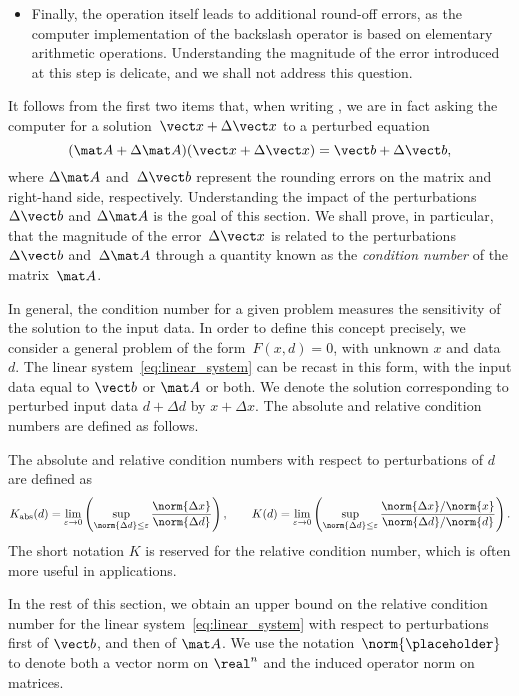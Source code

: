 \begin{example}
\begin{itemize}
    \item
        Finally, the operation  itself leads to additional round-off errors,
        as the computer implementation of the backslash operator is based on elementary arithmetic operations.
        Understanding the magnitude of the error introduced at this step is delicate,
        and we shall not address this question.
\end{itemize}
It follows from the first two items that, when writing ,
we are in fact asking the computer for a solution~$\vect x + \Delta \vect x$ to a perturbed equation
\[
    (\mat A + \Delta \mat A) (\vect x + \Delta \vect x) = \vect b + \Delta \vect b,
\]
where $\Delta \mat A$ and~$\Delta \vect b$ represent the rounding errors on the matrix and right-hand side, respectively.
Understanding the impact of the perturbations~$\Delta \vect b$ and $\Delta \mat A$ is the goal of this section.
We shall prove,
in particular,
that the magnitude of the error~$\Delta \vect x$ is related to the perturbations~$\Delta \vect b$ and~$\Delta \mat A$ through a quantity known as the \emph{condition number} of the matrix~$\mat A$.
\end{example}

In general, the condition number for a given problem measures the sensitivity of the solution to the input data.
In order to define this concept precisely,
we consider a general problem of the form~$F(x, d) = 0$,
with unknown $x$ and data $d$.
The linear system~\eqref{eq:linear_system} can be recast in this form,
with the input data equal to $\vect b$ or $\mat A$ or both.
We denote the solution corresponding to perturbed input data $d + \Delta d$ by $x + \Delta x$.
The absolute and relative condition numbers are defined as follows.

\begin{definition}
    [Condition number for the problem $F(x, d) = 0$]
    The absolute and relative condition numbers with respect to perturbations of $d$ are defined as
    \[
        K_{\rm abs}(d) = \lim_{\varepsilon \to 0} \left( \sup_{\norm{\Delta d} \leq \varepsilon} \frac{\norm{\Delta x}}{\norm{\Delta d}} \right),
        \qquad
        K(d) = \lim_{\varepsilon \to 0} \left( \sup_{\norm{\Delta d} \leq \varepsilon} \frac{\norm{\Delta x} / \norm{x}}{\norm{\Delta d} / \norm{d}} \right).
    \]
    The short notation $K$ is reserved for the relative condition number,
    which is often more useful in applications.
\end{definition}

In the rest of this section,
we obtain an upper bound on the relative condition number for the linear system~\eqref{eq:linear_system} with respect to perturbations first of $\vect b$,
and then of $\mat A$.
We use the notation~$\norm{\placeholder}$ to denote both a vector norm on $\real^n$ and the induced operator norm on matrices.

